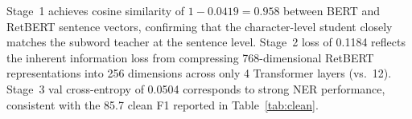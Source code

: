Stage~1 achieves cosine similarity of $1 - 0.0419 = 0.958$ between BERT and
RetBERT sentence vectors, confirming that the character-level student closely
matches the subword teacher at the sentence level.
Stage~2 loss of 0.1184 reflects the inherent information loss from compressing
768-dimensional RetBERT representations into 256 dimensions across only 4
Transformer layers (vs.\ 12).
Stage~3 val cross-entropy of 0.0504 corresponds to strong NER performance,
consistent with the 85.7 clean F1 reported in Table~\ref{tab:clean}.
